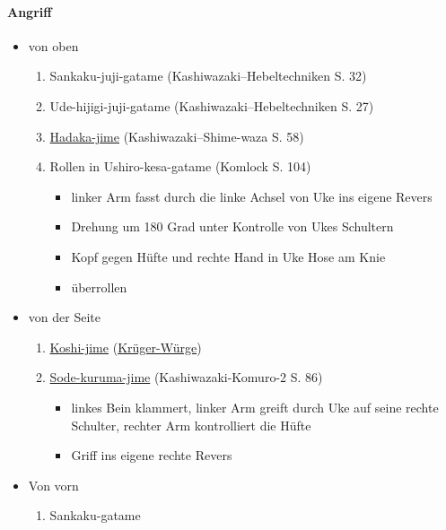 \documentclass[justified, a4paper, notitlepage, captions=tableheading, nobib]{tufte-handout}
\begin{document}
\paragraph{Angriff}
\label{sec:orgbf3e79f}
\begin{itemize}
\item von oben
\begin{enumerate}
\item Sankaku-juji-gatame (Kashiwazaki--Hebeltechniken S. 32)
\item Ude-hijigi-juji-gatame (Kashiwazaki--Hebeltechniken S. 27)
\item \hyperref[orga3070a6]{Hadaka-jime} (Kashiwazaki--Shime-waza S. 58)
\item Rollen in Ushiro-kesa-gatame (Komlock S. 104)
\begin{itemize}
\item linker Arm fasst durch die linke Achsel von Uke ins eigene Revers
\item Drehung um 180 Grad unter Kontrolle von Ukes Schultern
\item Kopf gegen Hüfte und rechte Hand in Uke Hose am Knie
\item überrollen
\end{itemize}
\end{enumerate}
\item von der Seite
\begin{enumerate}
\item \hyperref[orgdbeec5d]{Koshi-jime} (\hyperref[org2f16c30]{Krüger-Würge})
\item \hyperref[org66d000c]{Sode-kuruma-jime} (Kashiwazaki-Komuro-2 S. 86)
\begin{itemize}
\item linkes Bein klammert, linker Arm greift durch Uke auf seine rechte Schulter, rechter Arm kontrolliert die Hüfte
\item Griff ins eigene rechte Revers
\end{itemize}
\end{enumerate}
\item Von vorn
\begin{enumerate}
\item Sankaku-gatame
\end{enumerate}
\end{itemize}
\end{document}
